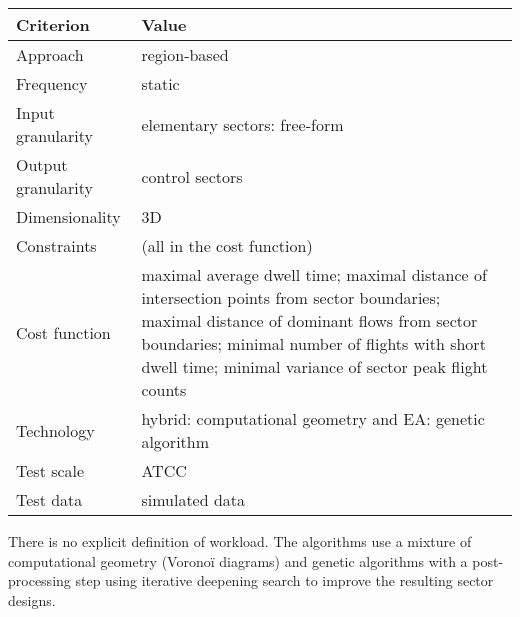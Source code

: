 \documentclass[a4paper,12pt]{article}
\begin{document}
\begin{center}
\begin{tabular}{|l|l|}
  \hline
  Criterion & Value \\
  \hline\hline
  Approach & region-based \\ \hline
  Frequency & static \\ \hline
  Input granularity & elementary sectors: free-form \\ \hline
  Output granularity & control sectors \\ \hline
  Dimensionality & 3D \\ \hline
  Constraints & (all in the cost function) \\ \hline
  Cost function & \parbox{11.5cm}{maximal average dwell time; maximal distance of
    intersection points from sector boundaries; maximal distance of
    dominant flows from sector boundaries; minimal number of
    flights with short dwell time; minimal variance of sector peak
    flight counts} \\ \hline
  Technology & hybrid: computational geometry and EA: genetic algorithm \\ \hline
  Test scale & ATCC \\ \hline
  Test data & simulated data \\ \hline
\end{tabular}
\end{center}
There is no explicit definition of workload.  The algorithms use a
mixture of computational geometry (Vorono\"i diagrams) and genetic
algorithms with a post-processing step using iterative deepening
search to improve the resulting sector designs.

\subsection{\cite{Jaegare:MSc11}}
\end{document}

